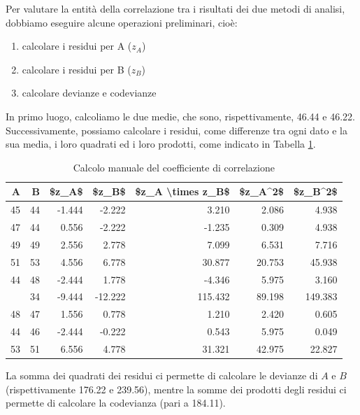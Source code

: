 \documentclass[
  12pt,
]{book}
\providecommand{\tightlist}{%
  \setlength{\itemsep}{0pt}\setlength{\parskip}{0pt}}
\begin{document}
Per valutare la entità della correlazione tra i risultati dei due metodi di analisi, dobbiamo eseguire alcune operazioni preliminari, cioè:

\begin{enumerate}
\def\labelenumi{\arabic{enumi}.}
\tightlist
\item
  calcolare i residui per A (\(z_A\))
\item
  calcolare i residui per B (\(z_B\))
\item
  calcolare devianze e codevianze
\end{enumerate}

In primo luogo, calcoliamo le due medie, che sono, rispettivamente, 46.44 e 46.22. Successivamente, possiamo calcolare i residui, come differenze tra ogni dato e la sua media, i loro quadrati ed i loro prodotti, come indicato in Tabella \ref{tab:tabName3}.

\begin{table}

\caption{\label{tab:tabName3}Calcolo manuale del coefficiente di correlazione}
\centering
\begin{tabular}[t]{rrrrrrr}
\toprule
A & B & \$z\_A\$ & \$z\_B\$ & \$z\_A \textbackslash{}times z\_B\$ & \$z\_A\textasciicircum{}2\$ & \$z\_B\textasciicircum{}2\$\\
\midrule
45 & 44 & -1.444 & -2.222 & 3.210 & 2.086 & 4.938\\
47 & 44 & 0.556 & -2.222 & -1.235 & 0.309 & 4.938\\
49 & 49 & 2.556 & 2.778 & 7.099 & 6.531 & 7.716\\
51 & 53 & 4.556 & 6.778 & 30.877 & 20.753 & 45.938\\
44 & 48 & -2.444 & 1.778 & -4.346 & 5.975 & 3.160\\
\addlinespace
37 & 34 & -9.444 & -12.222 & 115.432 & 89.198 & 149.383\\
48 & 47 & 1.556 & 0.778 & 1.210 & 2.420 & 0.605\\
44 & 46 & -2.444 & -0.222 & 0.543 & 5.975 & 0.049\\
53 & 51 & 6.556 & 4.778 & 31.321 & 42.975 & 22.827\\
\bottomrule
\end{tabular}
\end{table}

La somma dei quadrati dei residui ci permette di calcolare le devianze di \(A\) e \(B\) (rispettivamente 176.22 e 239.56), mentre la somme dei prodotti degli residui ci permette di calcolare la codevianza (pari a 184.11).
\end{document}
